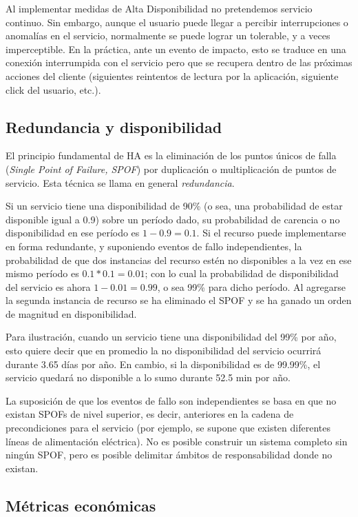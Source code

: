 Al implementar medidas de Alta Disponibilidad no pretendemos servicio continuo. Sin embargo, aunque el usuario puede llegar a percibir interrupciones o anomalías en el servicio, normalmente se puede lograr un  tolerable, y a veces imperceptible. En la práctica, ante un evento de impacto, esto se traduce en una conexión interrumpida con el servicio pero que se recupera dentro de las próximas acciones del cliente (siguientes reintentos de lectura por la aplicación, siguiente click del usuario, etc.). 

\subsection{Redundancia y disponibilidad}
El principio fundamental de HA es la eliminación de los puntos únicos de falla (\textit{Single Point of Failure, SPOF}) por duplicación o multiplicación de puntos de servicio. Esta técnica se llama en general \textit{redundancia}. 

Si un servicio tiene una disponibilidad de 90\% (o sea, una probabilidad de estar disponible igual a 0.9) sobre un período dado, su probabilidad de carencia o no disponibilidad en ese período es $1 - 0.9 = 0.1$. Si el recurso puede implementarse en forma redundante, y suponiendo eventos de fallo independientes, la probabilidad de que dos instancias del recurso estén no disponibles a la vez en ese mismo período es $0.1 * 0.1 = 0.01$; con lo cual la probabilidad de disponibilidad del servicio es ahora $1 - 0.01 = 0.99$, o sea 99\% para dicho período. Al agregarse la segunda instancia de recurso se ha eliminado el SPOF y se ha ganado un orden de magnitud en disponibilidad.
 
Para ilustración, cuando un servicio tiene una disponibilidad del 99\% por año, esto quiere decir que en promedio la no disponibilidad del servicio ocurrirá durante 3.65 días por año. En cambio, si la disponibilidad es de 99.99\%, el servicio quedará no disponible a lo sumo durante 52.5 min por año.

La suposición de que los eventos de fallo son independientes se basa en que no existan SPOFs de nivel superior, es decir, anteriores en la cadena de precondiciones para el servicio (por ejemplo, se supone que existen diferentes líneas de alimentación eléctrica). No es posible construir un sistema completo sin ningún SPOF, pero es posible delimitar ámbitos de responsabilidad donde no existan.



\subsection{Métricas económicas}

